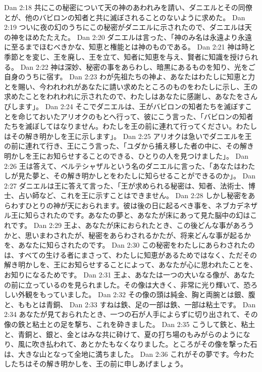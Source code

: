 Dan 2:18  共にこの秘密について天の神のあわれみを請い、ダニエルとその同僚とが、他のバビロンの知者と共に滅ぼされることのないように求めた。
Dan 2:19  ついに夜の幻のうちにこの秘密がダニエルに示されたので、ダニエルは天の神をほめたたえた。
Dan 2:20  ダニエルは言った、「神のみ名は永遠より永遠に至るまでほむべきかな、知恵と権能とは神のものである。
Dan 2:21  神は時と季節とを変じ、王を廃し、王を立て、知者に知恵を与え、賢者に知識を授けられる。
Dan 2:22  神は深妙、秘密の事をあらわし、暗黒にあるものを知り、光をご自身のうちに宿す。
Dan 2:23  わが先祖たちの神よ、あなたはわたしに知恵と力とを賜い、今われわれがあなたに請い求めたところのものをわたしに示し、王の求めたことをわれわれに示されたので、わたしはあなたに感謝し、あなたをさんびします」。
Dan 2:24  そこでダニエルは、王がバビロンの知者たちを滅ぼすことを命じておいたアリオクのもとへ行って、彼にこう言った、「バビロンの知者たちを滅ぼしてはなりません。わたしを王の前に連れて行ってください。わたしはその解き明かしを王に示します」。
Dan 2:25  アリオクは急いでダニエルを王の前に連れて行き、王にこう言った、「ユダから捕え移した者の中に、その解き明かしを王にお知らせすることのできる、ひとりの人を見つけました」。
Dan 2:26  王は答えて、ベルテシャザルという名のダニエルに言った、「あなたはわたしが見た夢と、その解き明かしとをわたしに知らせることができるのか」。
Dan 2:27  ダニエルは王に答えて言った、「王が求められる秘密は、知者、法術士、博士、占い師など、これを王に示すことはできません。
Dan 2:28  しかし秘密をあらわすひとりの神が天におられます。彼は後の日に起るべき事を、ネブカデネザル王に知らされたのです。あなたの夢と、あなたが床にあって見た脳中の幻はこれです。
Dan 2:29  王よ、あなたが床におられたとき、この後どんな事があろうかと、思いまわされたが、秘密をあらわされるかたが、将来どんな事が起るかを、あなたに知らされたのです。
Dan 2:30  この秘密をわたしにあらわされたのは、すべての生ける者にまさって、わたしに知恵があるためではなく、ただその解き明かしを、王にお知らせすることによって、あなたが心に思われたことを、お知りになるためです。
Dan 2:31  王よ、あなたは一つの大いなる像が、あなたの前に立っているのを見られました。その像は大きく、非常に光り輝いて、恐ろしい外観をもっていました。
Dan 2:32  その像の頭は純金、胸と両腕とは銀、腹と、ももとは青銅、
Dan 2:33  すねは鉄、足の一部は鉄、一部は粘土です。
Dan 2:34  あなたが見ておられたとき、一つの石が人手によらずに切り出されて、その像の鉄と粘土との足を撃ち、これを砕きました。
Dan 2:35  こうして鉄と、粘土と、青銅と、銀と、金とはみな共に砕けて、夏の打ち場のもみがらのようになり、風に吹き払われて、あとかたもなくなりました。ところがその像を撃った石は、大きな山となって全地に満ちました。
Dan 2:36  これがその夢です。今わたしたちはその解き明かしを、王の前に申しあげましょう。
